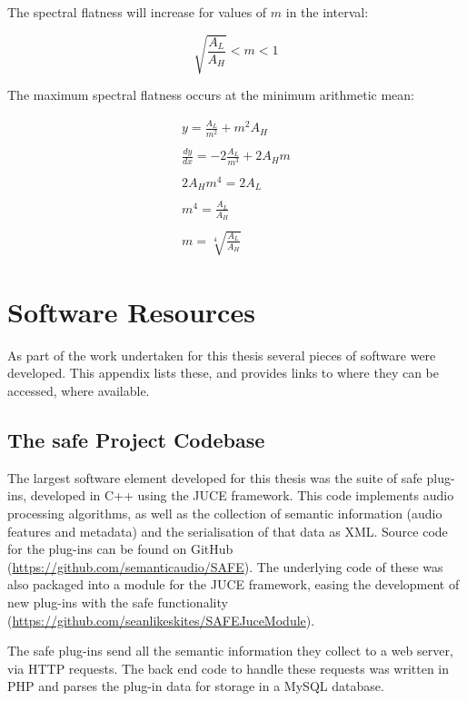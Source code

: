 \begin{appendices}
		The spectral flatness will increase for values of $m$ in the interval:

		\[ \sqrt{\frac{A_{L}}{A_{H}}} < m < 1 \]

		The maximum spectral flatness occurs at the minimum arithmetic mean:

		\begin{gather}
			y = \frac{A_{L}}{m^{2}} + m^{2}A_{H} \nonumber \\
			\nonumber \\
			\frac{dy}{dx} = -2\frac{A_{L}}{m^{3}} + 2A_{H}m \nonumber \\
			\nonumber \\
			2A_{H}m^{4} = 2A_{L} \nonumber \\
			\nonumber \\
			m^{4} = \frac{A_{L}}{A_{H}} \nonumber \\
			\nonumber \\
			m = \sqrt[4]{\frac{A_{L}}{A_{H}}} \nonumber
		\end{gather}

\chapter{Software Resources}
	As part of the work undertaken for this thesis several pieces of software were developed. This appendix lists these,
	and provides links to where they can be accessed, where available.
	
	\section{The \acrshort{safe} Project Codebase}
		The largest software element developed for this thesis was the suite of \acrshort{safe} plug-ins, developed
		in C++ using the JUCE framework. This code implements audio processing algorithms, as well as the collection
		of semantic information (audio features and metadata) and the serialisation of that data as XML. Source code
		for the plug-ins can be found on GitHub
		(\href{https://github.com/semanticaudio/SAFE}{https://github.com/semanticaudio/SAFE}). The underlying code
		of these was also packaged into a module for the JUCE framework, easing the development of new plug-ins with
		the \acrshort{safe} functionality
		(\href{https://github.com/seanlikeskites/SAFEJuceModule}{https://github.com/seanlikeskites/SAFEJuceModule}).

		The \acrshort{safe} plug-ins send all the semantic information they collect to a web server, via HTTP
		requests. The back end code to handle these requests was written in PHP and parses the plug-in data for
		storage in a MySQL database.


\end{appendices}
